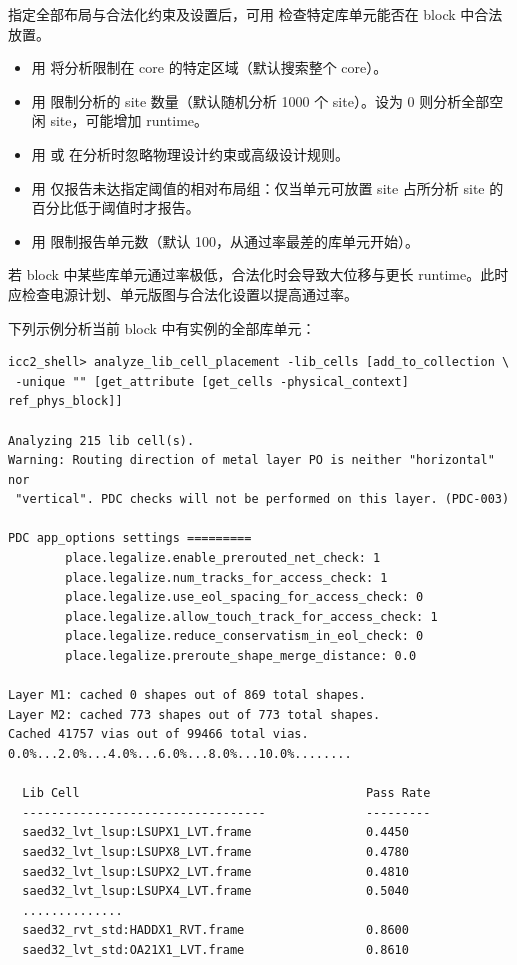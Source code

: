 指定全部布局与合法化约束及设置后，可用  检查特定库单元能否在 block 中合法放置。
\begin{itemize}
  \item 用  将分析限制在 core 的特定区域（默认搜索整个 core）。
  \item 用  限制分析的 site 数量（默认随机分析 1000 个 site）。设为 0 则分析全部空闲 site，可能增加 runtime。
  \item 用  或  在分析时忽略物理设计约束或高级设计规则。
  \item 用  仅报告未达指定阈值的相对布局组：仅当单元可放置 site 占所分析 site 的百分比低于阈值时才报告。
  \item 用  限制报告单元数（默认 100，从通过率最差的库单元开始）。
\end{itemize}

若 block 中某些库单元通过率极低，合法化时会导致大位移与更长 runtime。此时应检查电源计划、单元版图与合法化设置以提高通过率。

下列示例分析当前 block 中有实例的全部库单元：
\begin{lstlisting}
icc2_shell> analyze_lib_cell_placement -lib_cells [add_to_collection \
 -unique "" [get_attribute [get_cells -physical_context] ref_phys_block]]

Analyzing 215 lib cell(s).
Warning: Routing direction of metal layer PO is neither "horizontal" nor
 "vertical". PDC checks will not be performed on this layer. (PDC-003)

PDC app_options settings =========
        place.legalize.enable_prerouted_net_check: 1
        place.legalize.num_tracks_for_access_check: 1
        place.legalize.use_eol_spacing_for_access_check: 0
        place.legalize.allow_touch_track_for_access_check: 1
        place.legalize.reduce_conservatism_in_eol_check: 0
        place.legalize.preroute_shape_merge_distance: 0.0

Layer M1: cached 0 shapes out of 869 total shapes.
Layer M2: cached 773 shapes out of 773 total shapes.
Cached 41757 vias out of 99466 total vias.
0.0%...2.0%...4.0%...6.0%...8.0%...10.0%........

  Lib Cell                                        Pass Rate
  ----------------------------------              ---------
  saed32_lvt_lsup:LSUPX1_LVT.frame                0.4450
  saed32_lvt_lsup:LSUPX8_LVT.frame                0.4780
  saed32_lvt_lsup:LSUPX2_LVT.frame                0.4810
  saed32_lvt_lsup:LSUPX4_LVT.frame                0.5040
  ..............
  saed32_rvt_std:HADDX1_RVT.frame                 0.8600
  saed32_lvt_std:OA21X1_LVT.frame                 0.8610
\end{lstlisting}

